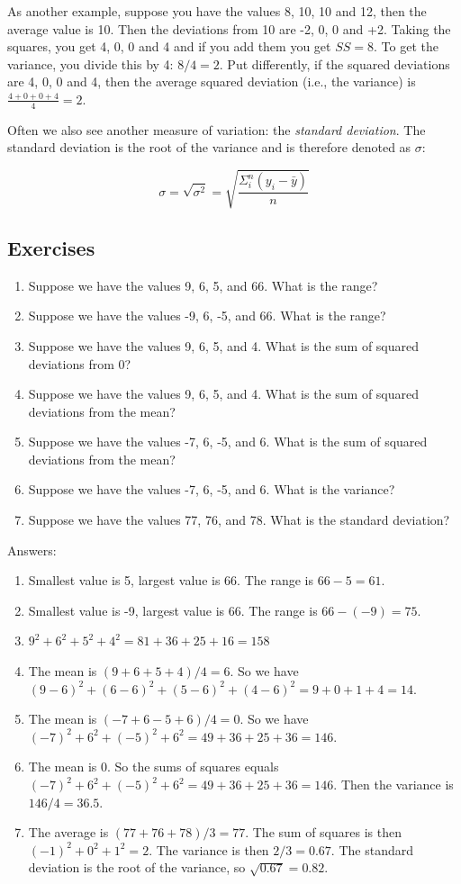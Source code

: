 \documentclass[]{report}\usepackage[]{graphicx}\usepackage[]{color}
\begin{document}
As another example, suppose you have the values 8, 10, 10 and 12, then the average value is 10. Then the deviations from 10 are -2, 0, 0 and +2. Taking the squares, you get 4, 0, 0 and 4 and if you add them you get $SS=8$. To get the variance, you divide this by 4: $8/4=2$. Put differently, if the squared deviations are 4, 0, 0 and 4, then the average squared deviation (i.e., the variance) is $\frac{4+0+0+4}{4}=2$.

Often we also see another measure of variation: the \textit{standard deviation}. The standard deviation is the root of the variance and is therefore denoted as $\sigma$:

\begin{equation}
\sigma = \sqrt{\sigma^2}=\sqrt{  \frac{\Sigma_i^n (y_i-\bar{y})}{n}}
\end{equation}


\subsection{Exercises}

\begin{enumerate}
\item Suppose we have the values 9, 6, 5, and 66. What is the range?
\item Suppose we have the values -9, 6, -5, and 66. What is the range?
\item Suppose we have the values 9, 6, 5, and 4. What is the sum of squared deviations from 0?
\item Suppose we have the values 9, 6, 5, and 4. What is the sum of squared deviations from the mean?
\item Suppose we have the values -7, 6, -5, and 6. What is the sum of squared deviations from the mean?
\item Suppose we have the values -7, 6, -5, and 6. What is the variance?
\item Suppose we have the values 77, 76, and 78. What is the standard deviation?
\end{enumerate}

Answers:


\begin{enumerate}
\item Smallest value is 5, largest value is 66. The range is $66-5=61$.
\item Smallest value is -9, largest value is 66. The range is $66-(-9)=75$.
\item $9^2+6^2+5^2+4^2=81+36+25+16=158$
\item The mean is $(9+6+5+4)/4=6$. So we have $(9-6)^2+(6-6)^2+(5-6)^2+(4-6)^2=9+0+1+4=14$.
\item The mean is $(-7+6-5+6)/4=0$. So we have $(-7)^2+6^2+(-5)^2+6^2=49+36+25+36=146$.
\item The mean is 0. So the sums of squares equals $(-7)^2+6^2+(-5)^2+6^2=49+36+25+36=146$. Then the variance is $146/4=36.5$.
\item The average is $(77+76+78)/3=77$. The sum of squares is then $(-1)^2+0^2+1^2=2$. The variance is then $2/3=0.67$. The standard deviation is the root of the variance, so $\sqrt{0.67}=0.82$.
\end{enumerate}
\end{document}
